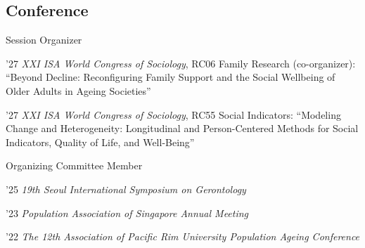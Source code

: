 \subsection{Conference}
\begin{aka}
    \item [2026--2027] Session Organizer
        \begin{akb}
        \item '27 \textit{XXI ISA World Congress of Sociology}, RC06 Family Research (co-organizer): ``Beyond Decline: Reconfiguring Family Support and the Social Wellbeing of Older Adults in Ageing Societies''
        \item '27 \textit{XXI ISA World Congress of Sociology}, RC55 Social Indicators: ``Modeling Change and Heterogeneity: Longitudinal and Person-Centered Methods for Social Indicators, Quality of Life, and Well-Being''
        \end{akb}
    \item [2022--2025] Organizing Committee Member
        \begin{akb}
        \item '25 \textit{19th Seoul International Symposium on Gerontology}
        \item '23 \textit{Population Association of Singapore Annual Meeting}
        \item '22 \textit{The 12th Association of Pacific Rim University Population Ageing Conference}
        \end{akb}
\end{aka}
